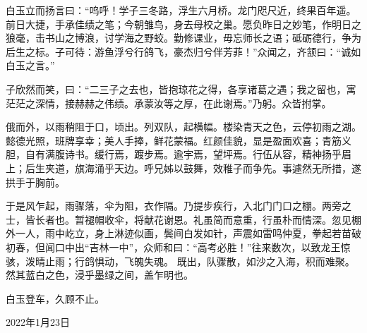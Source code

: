 \documentclass[a5paper]{ctexart}
\begin{document}
	白玉立而扬言曰：“呜呼！学子三冬路，浮生六月桥。龙门咫尺近，终果百年遥。前日大捷，手承佳绩之笔；今朝雏鸟，身去母校之巢。愿负昨日之妙笔，作明日之狼毫，击书山之博浪，讨学海之野蛟。勤修课业，毋忘师长之语；砥砺德行，争为后生之标。子可待：游鱼浮兮行鸽飞，豪杰归兮伴芳菲！”众闻之，齐颔曰：“诚如白玉之言。”
	
	子欣然而笑，曰：“二三子之去也，皆抱琼花之得，各享诸葛之遇；我之留也，寓茫茫之深情，接赫赫之伟绩。承蒙汝等之厚，在此谢焉。”乃躬。众皆拊掌。
	
	俄而外，以雨稍阻于口，顷出。列双队，起横幅。楼染青天之色，云停初雨之湖。懿德光照，班牌享幸；美人手捧，鲜花蒙福。红颜佳貌，显是盈面欢喜；青筋义胆，自有满腹诗书。缓行焉，踱步焉。逾宇焉，望坪焉。行伍从容，精神扬乎眉上；后生夹道，旗海涌乎天边。呼兄姊以鼓舞，效稚子而争先。事遽然无所措，遂拱手于胸前。
	
	于是风乍起，雨骤落，伞为阻，衣作隔。乃提步疾行，入北门门口之棚。两旁之士，皆长者也。暂褪帽收伞，将献花谢恩。礼虽简而意重，行虽朴而情深。忽见棚外一人，雨中屹立，身上淋迹似画，鬓间白发如针，声震如雷鸣仲夏，拳起若苗破初春，但闻口中出“吉林一中”，众师和曰：“高考必胜！”往来数次，以致龙王惊骇，泼晴止雨；行鸽惧动，飞魄失魂。
	既出，队骤散，如沙之入海，积而难聚。然其蓝白之色，浸乎墨绿之间，盖乍明也。
	
	白玉登车，久顾不止。
	\begin{flushright}
		2022年1月23日
	\end{flushright}
	
\end{document}
